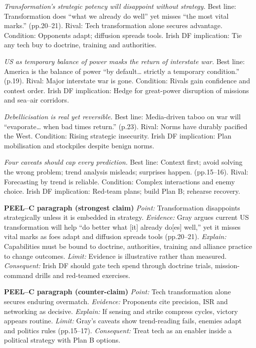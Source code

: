 \textit{Transformation’s strategic potency will disappoint without strategy.} Best line: Transformation does “what we already do well” yet misses “the most vital marks.” (pp.20–21). Rival: Tech transformation alone secures advantage. Condition: Opponents adapt; diffusion spreads tools. Irish DF implication: Tie any tech buy to doctrine, training and authorities.

\textit{US as temporary balance of power masks the return of interstate war.} Best line: America is the balance of power “by default… strictly a temporary condition.” (p.19). Rival: Major interstate war is gone. Condition: Rivals gain confidence and contest order. Irish DF implication: Hedge for great-power disruption of missions and sea–air corridors.

\textit{Debellicisation is real yet reversible.} Best line: Media-driven taboo on war will “evaporate… when bad times return.” (p.23). Rival: Norms have durably pacified the West. Condition: Rising strategic insecurity. Irish DF implication: Plan mobilisation and stockpiles despite benign norms.

\textit{Four caveats should cap every prediction.} Best line: Context first; avoid solving the wrong problem; trend analysis misleads; surprises happen. (pp.15–16). Rival: Forecasting by trend is reliable. Condition: Complex interactions and enemy choice. Irish DF implication: Red-team plans; build Plan B; rehearse recovery.

\textbf{PEEL–C paragraph (strongest claim)}
\textit{Point:} Transformation disappoints strategically unless it is embedded in strategy.
\textit{Evidence:} Gray argues current US transformation will help “do better what [it] already do[es] well,” yet it misses vital marks as foes adapt and diffusion spreads tools (pp.20–21).
\textit{Explain:} Capabilities must be bound to doctrine, authorities, training and alliance practice to change outcomes.
\textit{Limit:} Evidence is illustrative rather than measured.
\textit{Consequent:} Irish DF should gate tech spend through doctrine trials, mission-command drills and red-teamed exercises.

\textbf{PEEL–C paragraph (counter-claim)}
\textit{Point:} Tech transformation alone secures enduring overmatch.
\textit{Evidence:} Proponents cite precision, ISR and networking as decisive.
\textit{Explain:} If sensing and strike compress cycles, victory appears routine.
\textit{Limit:} Gray’s caveats show trend-reading fails, enemies adapt and politics rules (pp.15–17).
\textit{Consequent:} Treat tech as an enabler inside a political strategy with Plan B options.

